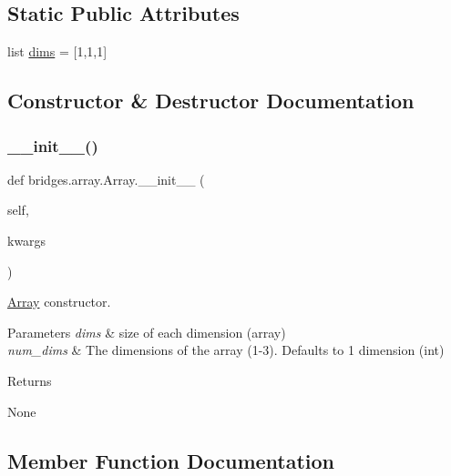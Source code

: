 \subsection*{Static Public Attributes}
\begin{DoxyCompactItemize}
\item 
list \mbox{\hyperlink{classbridges_1_1array_1_1_array_a69f2c673a6077e203b3e916dd73cd243}{dims}} = \mbox{[}1,1,1\mbox{]}
\end{DoxyCompactItemize}


\subsection{Constructor \& Destructor Documentation}
\mbox{\label{classbridges_1_1array_1_1_array_ac772cbf7ad482b235e30929c8e1063a4}} 
\subsubsection{\texorpdfstring{\+\_\+\+\_\+init\+\_\+\+\_\+()}{\_\_init\_\_()}}
{\footnotesize\ttfamily def bridges.\+array.\+Array.\+\_\+\+\_\+init\+\_\+\+\_\+ (\begin{DoxyParamCaption}\item[{}]{self,  }\item[{}]{kwargs }\end{DoxyParamCaption})}



\mbox{\hyperlink{classbridges_1_1array_1_1_array}{Array}} constructor. 


\begin{DoxyParams}{Parameters}
{\em dims} & size of each dimension (array) \\
\hline
{\em num\+\_\+dims} & The dimensions of the array (1-\/3). Defaults to 1 dimension (int) \\
\hline
\end{DoxyParams}
\begin{DoxyReturn}{Returns}


None 
\end{DoxyReturn}


\subsection{Member Function Documentation}
\mbox{\label{classbridges_1_1array_1_1_array_ad97d5a2cb4bffa4a6bcdb15a3ece0974}} 
